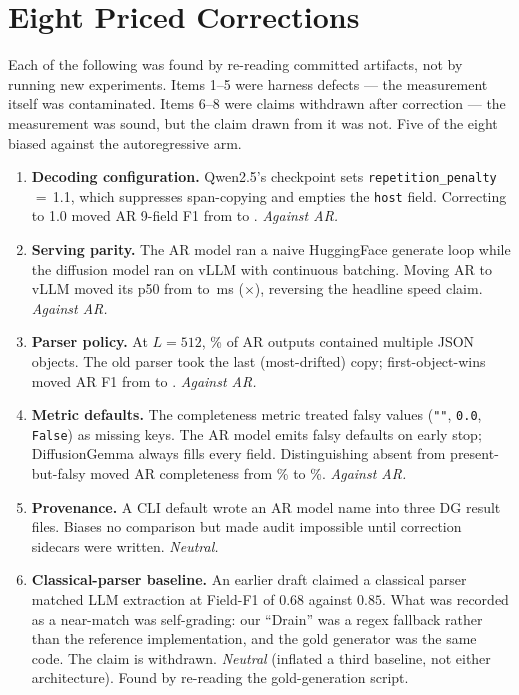 \section{Eight Priced Corrections}
\label{app:defects}

Each of the following was found by re-reading committed artifacts, not by
running new experiments. Items 1--5 were harness defects --- the measurement
itself was contaminated. Items 6--8 were claims withdrawn after correction
--- the measurement was sound, but the claim drawn from it was not. Five of
the eight biased against the autoregressive arm.

\begin{enumerate}
\item \textbf{Decoding configuration.} Qwen2.5's checkpoint sets
\texttt{repetition\_penalty}\,$=$\,1.1, which suppresses span-copying and
empties the \texttt{host} field. Correcting to 1.0 moved AR 9-field F1 from
 to . \emph{Against AR.}

\item \textbf{Serving parity.} The AR model ran a naive HuggingFace generate
loop while the diffusion model ran on vLLM with continuous batching. Moving
AR to vLLM moved its p50 from  to \,ms
($\times$), reversing the headline speed claim.
\emph{Against AR.}

\item \textbf{Parser policy.} At $L{=}512$, \rambleRate\% of AR outputs
contained multiple JSON objects. The old parser took the last (most-drifted)
copy; first-object-wins moved AR F1 from  to
. \emph{Against AR.}

\item \textbf{Metric defaults.} The completeness metric treated falsy values
(\texttt{""}, \texttt{0.0}, \texttt{False}) as missing keys. The AR model
emits falsy defaults on early stop; DiffusionGemma always fills every field.
Distinguishing absent from present-but-falsy moved AR completeness from
\% to \%. \emph{Against AR.}

\item \textbf{Provenance.} A CLI default wrote an AR model name into three DG
result files. Biases no comparison but made audit impossible until correction
sidecars were written. \emph{Neutral.}

\item \textbf{Classical-parser baseline.} An earlier draft claimed a classical
parser matched LLM extraction at Field-F1 of $0.68$ against $0.85$. What was
recorded as a near-match was self-grading: our ``Drain'' was a regex fallback
rather than the reference implementation, and the gold generator was the same
code. The claim is withdrawn. \emph{Neutral} (inflated a third baseline, not
either architecture). Found by re-reading the gold-generation script.


\end{enumerate}
